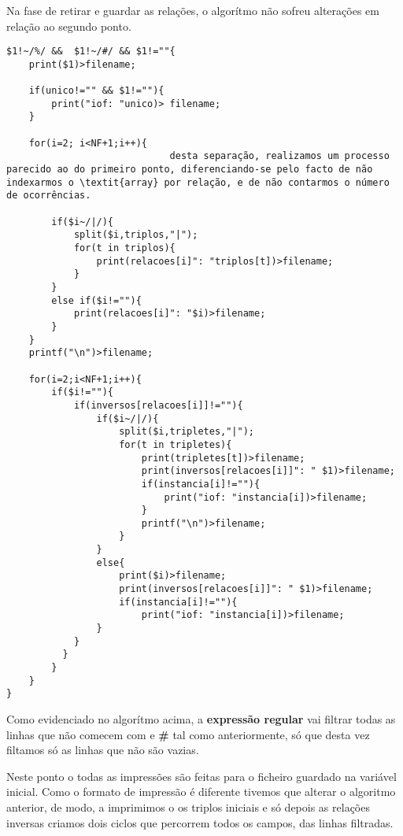 \documentclass{report}
\begin{document}
    Na fase de retirar e guardar as relações, o algorítmo não sofreu alterações em relação ao segundo ponto.

\begin{verbatim}
$1!~/%/ &&  $1!~/#/ && $1!=""{  
    print($1)>filename;
    
    if(unico!="" && $1!=""){
        print("iof: "unico)> filename;
    }

    for(i=2; i<NF+1;i++){
                             desta separação, realizamos um processo parecido ao do primeiro ponto, diferenciando-se pelo facto de não indexarmos o \textit{array} por relação, e de não contarmos o número de ocorrências.    

        if($i~/|/){
            split($i,triplos,"|");
            for(t in triplos){
                print(relacoes[i]": "triplos[t])>filename;
            }
        }
        else if($i!=""){
            print(relacoes[i]": "$i)>filename;
        }
    }
    printf("\n")>filename;

    for(i=2;i<NF+1;i++){
        if($i!=""){
            if(inversos[relacoes[i]]!=""){
                if($i~/|/){
                    split($i,tripletes,"|");
                    for(t in tripletes){
                        print(tripletes[t])>filename;
                        print(inversos[relacoes[i]]": " $1)>filename;
                        if(instancia[i]!=""){
                            print("iof: "instancia[i])>filename;
                        }
                        printf("\n")>filename;
                    }
                }
                else{
                    print($i)>filename;
                    print(inversos[relacoes[i]]": " $1)>filename;
                    if(instancia[i]!=""){
                        print("iof: "instancia[i])>filename;
                }
            }
          }
        }
    }
}                          
\end{verbatim}

    Como evidenciado no algorítmo acima, a \textbf{expressão regular} vai filtrar todas as linhas que não comecem com \texbf{\%} e \textbf{\#} tal como anteriormente, só que desta vez filtamos só as linhas que não são vazias.

    Neste ponto o todas as impressões são feitas para o ficheiro guardado na variável inicial. Como o formato de impressão é diferente tivemos que alterar o algoritmo anterior, de modo, a imprimimos o os triplos iniciais e só depois as relações inversas criamos dois ciclos que percorrem todos os campos, das linhas filtradas.
\end{document}
